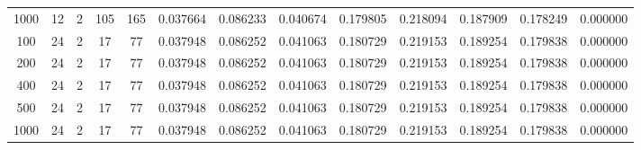 \begin{table}[h]
\begin{tabular}{ccccccccccccc}
1000 & 12 & 2 & 105 & 165 & 0.037664 & 0.086233 & 0.040674 & 0.179805 & 0.218094 & 0.187909 & 0.178249 & 0.000000 \\
100 & 24 & 2 & 17 & 77 & 0.037948 & 0.086252 & 0.041063 & 0.180729 & 0.219153 & 0.189254 & 0.179838 & 0.000000 \\
200 & 24 & 2 & 17 & 77 & 0.037948 & 0.086252 & 0.041063 & 0.180729 & 0.219153 & 0.189254 & 0.179838 & 0.000000 \\
400 & 24 & 2 & 17 & 77 & 0.037948 & 0.086252 & 0.041063 & 0.180729 & 0.219153 & 0.189254 & 0.179838 & 0.000000 \\
500 & 24 & 2 & 17 & 77 & 0.037948 & 0.086252 & 0.041063 & 0.180729 & 0.219153 & 0.189254 & 0.179838 & 0.000000 \\
1000 & 24 & 2 & 17 & 77 & 0.037948 & 0.086252 & 0.041063 & 0.180729 & 0.219153 & 0.189254 & 0.179838 & 0.000000 \\
\bottomrule
\end{tabular}
\end{table}
